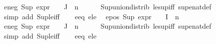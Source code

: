 \begin{isabellebody}
\ e{}{\isacharunderscore}{\kern0pt}neg{\isacharcolon}{\kern0pt}\ {\isachardoublequoteopen}Sup\ {\isacharparenleft}{\kern0pt}{\isacharparenleft}{\kern0pt}expr{\isacharunderscore}{\kern0pt}{}\ {\isasymcirc}\ {\isasymPhi}{\isacharparenright}{\kern0pt}\ {\isacharbackquote}{\kern0pt}\ J{\isacharparenright}{\kern0pt}\ {\isasymle}\ n{}{\isachardoublequoteclose}\isanewline
\ \ \ \ \isamarkupfalse%
\ Sup{\isacharunderscore}{\kern0pt}union{\isacharunderscore}{\kern0pt}distrib\ le{\isacharunderscore}{\kern0pt}sup{\isacharunderscore}{\kern0pt}iff\ sup{\isacharunderscore}{\kern0pt}enat{\isacharunderscore}{\kern0pt}def\isanewline
\ \ \ \ \isamarkupfalse%
\ {\isacharparenleft}{\kern0pt}simp\ add{\isacharcolon}{\kern0pt}\ Sup{\isacharunderscore}{\kern0pt}le{\isacharunderscore}{\kern0pt}iff{\isacharparenright}{\kern0pt}{\isacharplus}{\kern0pt}\isanewline
\isanewline
\ \ \isamarkupfalse%
\ e{}{\isacharunderscore}{\kern0pt}eq\ e{}{\isacharunderscore}{\kern0pt}le\ \isamarkupfalse%
\ e{}{\isacharunderscore}{\kern0pt}pos{\isacharcolon}{\kern0pt}\ {\isachardoublequoteopen}Sup\ {\isacharparenleft}{\kern0pt}{\isacharparenleft}{\kern0pt}expr{\isacharunderscore}{\kern0pt}{}\ {\isasymcirc}\ {\isasymPhi}{\isacharparenright}{\kern0pt}\ {\isacharbackquote}{\kern0pt}\ I{\isacharparenright}{\kern0pt}\ {\isacharless}{\kern0pt}{\isacharequal}{\kern0pt}\ n{}{\isachardoublequoteclose}\isanewline
{}\ e{}{\isacharunderscore}{\kern0pt}neg{\isacharcolon}{\kern0pt}\ {\isachardoublequoteopen}Sup\ {\isacharparenleft}{\kern0pt}{\isacharparenleft}{\kern0pt}expr{\isacharunderscore}{\kern0pt}{}\ {\isasymcirc}\ {\isasymPhi}{\isacharparenright}{\kern0pt}\ {\isacharbackquote}{\kern0pt}\ J{\isacharparenright}{\kern0pt}\ {\isacharless}{\kern0pt}{\isacharequal}{\kern0pt}\ n{}{\isachardoublequoteclose}\isanewline
\ \ \ \ \isamarkupfalse%
\ Sup{\isacharunderscore}{\kern0pt}union{\isacharunderscore}{\kern0pt}distrib\ le{\isacharunderscore}{\kern0pt}sup{\isacharunderscore}{\kern0pt}iff\ sup{\isacharunderscore}{\kern0pt}enat{\isacharunderscore}{\kern0pt}def\isanewline
\ \ \ \ \isamarkupfalse%
\ {\isacharparenleft}{\kern0pt}simp\ add{\isacharcolon}{\kern0pt}\ Sup{\isacharunderscore}{\kern0pt}le{\isacharunderscore}{\kern0pt}iff{\isacharparenright}{\kern0pt}{\isacharplus}{\kern0pt}\isanewline
\isanewline
\ \ \isamarkupfalse%
\ e{}{\isacharunderscore}{\kern0pt}eq\ e{}{\isacharunderscore}{\kern0pt}le\ \isamarkupfalse%

\end{isabellebody}
